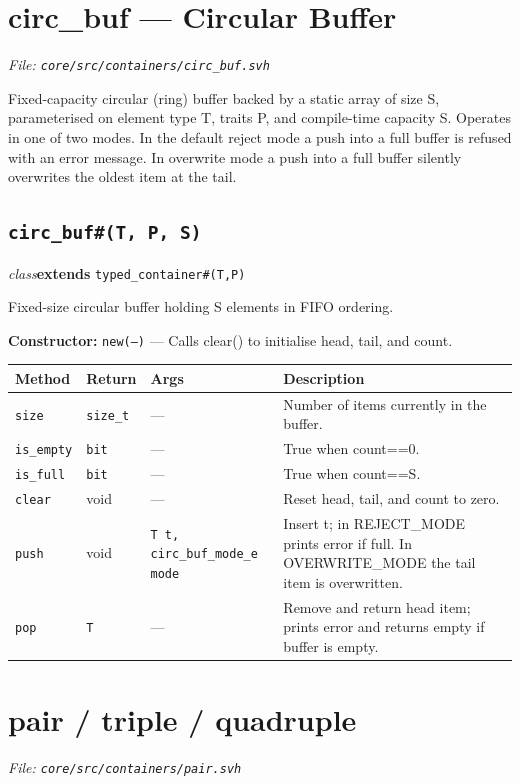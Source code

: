 \documentclass[11pt,letterpaper]{report}
\begin{document}
\section{circ\_buf --- Circular Buffer}
\noindent\small\textit{File: \texttt{core/src/containers/circ\_buf.svh}}\par

Fixed-capacity circular (ring) buffer backed by a static array of size S, parameterised on element type T, traits P, and compile-time capacity S. Operates in one of two modes. In the default reject mode a push into a full buffer is refused with an error message. In overwrite mode a push into a full buffer silently overwrites the oldest item at the tail.

\subsection*{\texttt{circ\_buf\#(T, P, S)}}
\noindent\small\textit{class}\quad \textbf{extends} \texttt{typed\_container\#(T,P)}\par

Fixed-size circular buffer holding S elements in FIFO ordering.

\noindent\textbf{Constructor:} \texttt{new(---)} --- Calls clear() to initialise head, tail, and count.

\begin{xltabular}{\linewidth}{>{\small}p{1.35in} >{\small}p{1.25in} >{\small}p{0.95in} >{\small}X}
\toprule
\textbf{Method} & \textbf{Return} & \textbf{Args} & \textbf{Description} \\
\midrule
\endhead
\bottomrule
\endfoot
\texttt{size} & \texttt{size\_t} & --- & Number of items currently in the buffer. \\
\texttt{is\_empty} & \texttt{bit} & --- & True when count==0. \\
\texttt{is\_full} & \texttt{bit} & --- & True when count==S. \\
\texttt{clear} & void & --- & Reset head, tail, and count to zero. \\
\texttt{push} & void & \texttt{T t, circ\_buf\_mode\_e mode} & Insert t; in REJECT\_MODE prints error if full. In OVERWRITE\_MODE the tail item is overwritten. \\
\texttt{pop} & \texttt{T} & --- & Remove and return head item; prints error and returns empty if buffer is empty. \\
\end{xltabular}

\section{pair / triple / quadruple}
\noindent\small\textit{File: \texttt{core/src/containers/pair.svh}}\par
\end{document}
